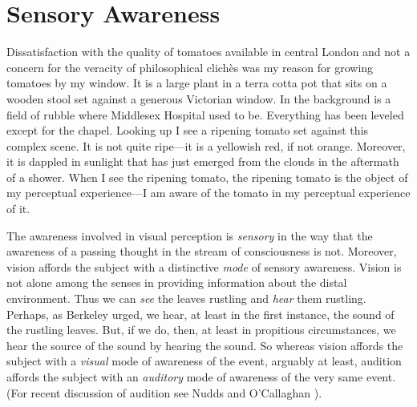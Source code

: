 \documentclass[12pt]{article}
\begin{document}
\section{Sensory Awareness} %
\label{sec:sensory_awareness}

Dissatisfaction with the quality of tomatoes available in central London and not a concern for the veracity of philosophical clichès was my reason for growing tomatoes by my window. It is a large plant in a terra cotta pot that sits on a wooden stool set against a generous Victorian window. In the background is a field of rubble where Middlesex Hospital used to be. Everything has been leveled except for the chapel. Looking up I see a ripening tomato set against this complex scene. It is not quite ripe---it is a yellowish red, if not orange. Moreover, it is dappled in sunlight that has just emerged from the clouds in the aftermath of a shower. When I see the ripening tomato, the ripening tomato is the object of my perceptual experience---I am aware of the tomato in my perceptual experience of it. 

The awareness involved in visual perception is \emph{sensory} in the way that the awareness of a passing thought in the stream of consciousness is not. Moreover, vision affords the subject with a distinctive \emph{mode} of sensory awareness. Vision is not alone among the senses in providing information about the distal environment. Thus we can \emph{see} the leaves rustling and \emph{hear} them rustling. Perhaps, as Berkeley urged, we hear, at least in the first instance, the sound of the rustling leaves. But, if we do, then, at least in propitious circumstances, we hear the source of the sound by hearing the sound. So whereas vision affords the subject with a \emph{visual} mode of awareness of the event, arguably at least, audition affords the subject with an \emph{auditory} mode of awareness of the very same event. (For recent discussion of audition see Nudds and O'Callaghan \citeyear{Nudds:2009sk}).
\end{document}
